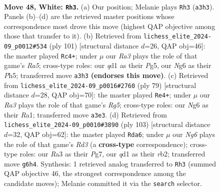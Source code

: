 \documentclass[11pt]{article}
\begin{document}
\clearpage

\begin{figure}[p]\centering
\begin{subfigure}{0.46\textwidth}\centering
\resizebox{\linewidth}{!}{%
\newchessgame
\chessboard[
  setfen={6k1/2r3p1/1p4N1/r7/P2pp3/R7/5PK1/3q4 w - - 0 48},
  showmover=false,
  pgfstyle=straightmove, color=movearrow, markmove={a3-h3}
]}
\caption{}
\end{subfigure}\hfill
\begin{subfigure}{0.46\textwidth}\centering
\resizebox{\linewidth}{!}{%
\newchessgame
\chessboard[
  setfen={2K5/1P6/4p3/3kP1pp/r7/p5P1/R6P/8 b - - 2 51},
  showmover=false,
  pgfstyle=straightmove, color=movearrow, markmove={a4-c4}
]}
\caption{}
\end{subfigure}
\\[4pt]
\begin{subfigure}{0.46\textwidth}\centering
\resizebox{\linewidth}{!}{%
\newchessgame
\chessboard[
  setfen={8/8/4pRpk/2RpP3/6r1/1P6/4KP2/r7 b - - 2 40},
  showmover=false,
  pgfstyle=straightmove, color=movearrow, markmove={g4-e4}
]}
\caption{}
\end{subfigure}\hfill
\begin{subfigure}{0.46\textwidth}\centering
\resizebox{\linewidth}{!}{%
\newchessgame
\chessboard[
  setfen={8/6pk/3r4/7p/rP6/2K3P1/pR5P/R7 b - - 1 52},
  showmover=false,
  pgfstyle=straightmove, color=movearrow, markmove={d6-a6}
]}
\caption{}
\end{subfigure}
\caption{\textbf{Move 48, White: \texttt{Rh3}.} (a) Our position; Melanie plays \texttt{Rh3} (\texttt{a3h3}). Panels (b)--(d) are the retrieved master positions whose correspondence most drove this move (highest QAP objective among those that transfer to it). (b) Retrieved from \texttt{lichess\_elite\_2024-09\_p0012\#534} (ply 101) [structural distance $d$=26, QAP obj=46]: the master played \texttt{Rc4+}; under $\mu$ our \emph{Ra3} plays the role of that game's \emph{Ra5}; cross-type roles: our \emph{q}d1 as their \emph{P}g5, our \emph{N}g6 as their \emph{P}h5; transferred move \texttt{a3h3} \textbf{(endorses this move)}. (c) Retrieved from \texttt{lichess\_elite\_2024-09\_p0016\#2760} (ply 79) [structural distance $d$=28, QAP obj=70]: the master played \texttt{Re4+}; under $\mu$ our \emph{Ra3} plays the role of that game's \emph{Rg5}; cross-type roles: our \emph{N}g6 as their \emph{R}a1; transferred move \texttt{a3e3}. (d) Retrieved from \texttt{lichess\_elite\_2024-09\_p0010\#3890} (ply 103) [structural distance $d$=32, QAP obj=62]: the master played \texttt{Rda6}; under $\mu$ our \emph{Ng6} plays the role of that game's \emph{Rd3} (a \textbf{cross-type} correspondence); cross-type roles: our \emph{R}a3 as their \emph{P}g7, our \emph{q}d1 as their \emph{r}b2; transferred move \texttt{g6h4}. Synthesis: 1 retrieved analog transferred to \texttt{Rh3} (summed QAP objective 46, the strongest correspondence among the candidate moves); Melanie committed it via the \texttt{search} selector.}
\label{fig:thought-m94}
\end{figure}
\end{document}

